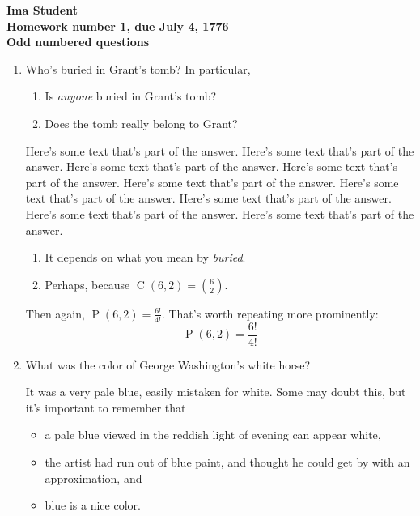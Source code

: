 \documentclass[12pt]{amsart}
\DeclareMathOperator{\perm}{P}
\DeclareMathOperator{\comb}{C}
\begin{document}
\begin{center}
  \bfseries
  Ima Student\\
  Homework number 1, due July 4, 1776\\
  Odd numbered questions
\end{center}

\bigskip

\begin{enumerate}
\item Who's buried in Grant's tomb?  In particular,
  \begin{enumerate}
  \item Is \emph{anyone} buried in Grant's tomb?
  \item Does the tomb really belong to Grant?
  \end{enumerate}

  Here's some text that's part of the answer. Here's some text that's
  part of the answer. Here's some text that's part of the
  answer. Here's some text that's part of the answer. Here's some text
  that's part of the answer. Here's some text that's part of the
  answer. Here's some text that's part of the answer. Here's some text
  that's part of the answer. Here's some text that's part of the
  answer.
  \begin{enumerate}
  \item It depends on what you mean by \emph{buried}.
  \item Perhaps, because $\comb(6,2) = \binom{6}{2}$.
  \end{enumerate}
  Then again, $\perm(6,2) = \frac{6!}{4!}$.  That's worth repeating
  more prominently:
  \begin{displaymath}
    \perm(6,2) = \frac{6!}{4!}
  \end{displaymath}

\item What was the color of George Washington's white horse?

  It was a very pale blue, easily mistaken for white.  Some may doubt
  this, but it's important to remember that
  \begin{itemize}
  \item a pale blue viewed in the reddish light of evening can appear
    white,
  \item the artist had run out of blue paint, and thought he could get
    by with an approximation, and
  \item blue is a nice color.
  \end{itemize}


\end{enumerate}
\end{document}
